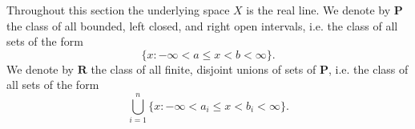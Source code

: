 Throughout this section the underlying space $X$ is the real line. We denote by $\mathbf{P}$ the class of all bounded, left closed, and right open intervals, i.e. the class of all sets of the form
$$\{x: -\infty < a \leq x < b < \infty\}.$$
We denote by $\mathbf{R}$ the class of all finite, disjoint unions of sets of $\mathbf{P}$, i.e. the class of all sets of the form
$$\bigcup_{i=1}^{n} \{x: -\infty < a_i \leq x < b_i < \infty\}.$$
